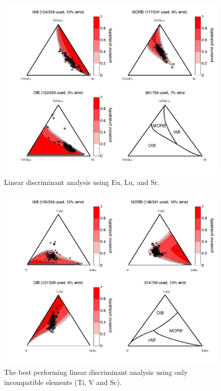 \begin{figure}[htbp]
  \centering
  \includegraphics[width=600]{figures/Eu_Lu_Sr_lin.jpg}
  \caption[Linear discriminant analysis using Eu, Lu, and Sr]
{Linear discriminant analysis using Eu, Lu, and Sr.}
  \label{fig:Eu_Lu_Sr_lin}
\end{figure}

\begin{figure}[htbp]
  \centering
  \includegraphics[width=600]{figures/V_Ti_Sc_lin.jpg}
  \caption[Linear discriminant analysis using Ti, V and Sc]
{The   best  performing  linear   discriminant  analysis   using  only
incompatible elements (Ti, V and Sc).}
  \label{fig:V_Ti_Sc_lin}
\end{figure}

